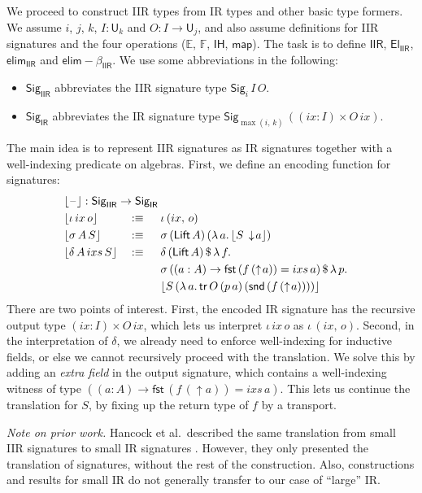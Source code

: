 \documentclass[acmsmall,screen,review]{acmart}
\newcommand{\msf}[1]{{\mathsf{#1}}}
\newcommand{\mbb}[1]{\mathbb{#1}}
\newcommand{\U}{\msf{U}}
\newcommand{\El}{\msf{El}}
\newcommand{\Lift}{\msf{Lift}}
\newcommand{\lup}{\uparrow}
\newcommand{\ldown}{\downarrow}
\newcommand{\Sig}{\msf{Sig}}
\newcommand{\blank}{{\mathord{\hspace{1pt}\text{--}\hspace{1pt}}}}
\newcommand{\ix}{{ix}}
\newcommand{\ixs}{{ixs}}
\newcommand{\IR}{\msf{IR}}
\newcommand{\IH}{\msf{IH}}
\newcommand{\map}{\msf{map}}
\newcommand{\elim}{\msf{elim}}
\newcommand{\tr}{\msf{tr}}
\newcommand{\fst}{\msf{fst}}
\newcommand{\snd}{\msf{snd}}
\newcommand{\IIR}{\msf{IIR}}
\newcommand{\Sigr}[1]{\lfloor #1 \rfloor}
\newcommand{\E}{\mbb{E}}
\newcommand{\F}{\mbb{F}}
\begin{document}
We proceed to construct IIR types from IR types and other basic type formers. We assume $i$, $j$,
$k$, $I : \U_k$ and $O : I \to \U_j$, and also assume definitions for IIR signatures and the four
operations ($\E$, $\F$, $\IH$, $\map$). The task is to define $\IIR$,
$\El_{\IIR}$, $\elim_{\IIR}$ and $\elim\!-\!\!\beta_{\IIR}$. We use some abbreviations in the following:
\begin{itemize}
\item $\Sig_\IIR$ abbreviates the IIR signature type $\Sig_i\,I\,O$.
\item $\Sig_\IR$ abbreviates the IR signature type $\Sig_{\max(i,\,k)}\,((\ix : I) \times O\,\ix)$.
\end{itemize}
The main idea is to represent IIR signatures as IR signatures together with a
well-indexing predicate on algebras. First, we define an encoding function for signatures:
\begin{alignat*}{4}
  & \rlap{$\Sigr{\blank} : \Sig_\IIR \to \Sig_\IR$}\\
  & \Sigr{\iota\,\ix\,o}      &&:\equiv \hspace{0.5em} &&\iota\,(\ix,\,o)\\
  & \Sigr{\sigma\,A\,S}       &&:\equiv \hspace{0.5em} &&\sigma\,(\Lift\,A)\,(\lambda\,a.\,\Sigr{S\,\ldown\!a})\\
  & \Sigr{\delta\,A\,\ixs\,S} &&:\equiv \hspace{0.5em} &&\delta\,(\Lift\,A)\,\$\,\lambda\,f.\\
  &  &&                                &&\sigma\,((a : A) \to \fst\,(f\,(\lup\!a)) = \ixs\,a)\,\$\,\lambda\,p.\\
  &  &&                                &&\Sigr{S\,(\lambda\,a.\,\tr\,O\,(p\,a)\,(\snd\,(f\,(\lup\! a))))}
\end{alignat*}
There are two points of interest. First, the encoded IR signature has the recursive output type $(\ix
: I) \times O\,\ix$, which lets us interpret $\iota\,\ix\,o$ as $\iota\,(\ix,\,o)$. Second, in the
interpretation of $\delta$, we already need to enforce well-indexing for inductive fields, or else
we cannot recursively proceed with the translation. We solve this by adding an \emph{extra field} in
the output signature, which contains a well-indexing witness of type $((a : A) \to \fst\,(f\,(\lup\!a)) = \ixs\,a)$.
This lets us continue the translation for $S$, by fixing up the return type of $f$ by a transport.

\emph{Note on prior work.} Hancock et al.\ described the same translation from small IIR signatures
to small IR signatures \cite[Section~6]{DBLP:conf/tlca/HancockMGMA13}. However, they only presented
the translation of signatures, without the rest of the construction. Also, constructions and results
for small IR do not generally transfer to our case of ``large'' IR.
\end{document}
